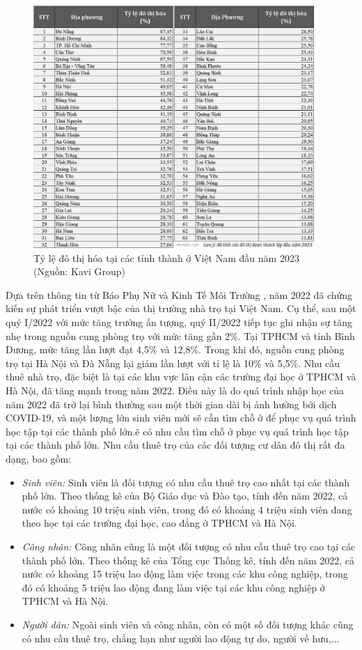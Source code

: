 \begin{figure}[H]
    \centering
    \includegraphics[width=0.95\textwidth]{Images/Overview/TyLeDoThiHoa.jpg}
    \caption{Tỷ lệ đô thị hóa tại các tỉnh thành ở Việt Nam đầu năm 2023 (Nguồn: Kavi Group)}
\end{figure}
\hspace*{1cm} Dựa trên thông tin từ Báo Phụ Nữ \cite{phunu} và Kinh Tế Môi Trường \cite{ktmt}, năm 2022 đã chứng kiến sự phát triển vượt bậc của thị trường nhà trọ tại Việt Nam. Cụ thể, sau một quý I/2022 với mức tăng trưởng ấn tượng, quý II/2022 tiếp tục ghi nhận sự tăng nhẹ trong nguồn cung phòng trọ với mức tăng gần 2\%. Tại TPHCM và tỉnh Bình Dương, mức tăng lần lượt đạt 4,5\% và 12,8\%. Trong khi đó, nguồn cung phòng trọ tại Hà Nội và Đà Nẵng lại giảm lần lượt với tỉ lệ là 10\% và 5,5\%. Nhu cầu thuê nhà trọ, đặc biệt là tại các khu vực lân cận các trường đại học ở TPHCM và Hà Nội, đã tăng mạnh trong năm 2022. Điều này là do quá trình nhập học của năm 2022 đã trở lại bình thường sau một thời gian dài bị ảnh hưởng bởi dịch COVID-19, và một lượng lớn sinh viên mới sẽ cần tìm chỗ ở để phục vụ quá trình học tập tại các thành phố lớn.ẽ có nhu cầu tìm chỗ ở phục vụ quá trình học tập tại các thành phố lớn.
Nhu cầu thuê trọ của các đối tượng cư dân đô thị rất đa dạng, bao gồm:
\begin{itemize}
    \item \textit{Sinh viên:} Sinh viên là đối tượng có nhu cầu thuê trọ cao nhất tại các thành phố lớn. Theo thống kê của Bộ Giáo dục và Đào tạo, tính đến năm 2022, cả nước có khoảng 10 triệu sinh viên, trong đó có khoảng 4 triệu sinh viên đang theo học tại các trường đại học, cao đẳng ở TPHCM và Hà Nội.
    \item \textit{Công nhân:} Công nhân cũng là một đối tượng có nhu cầu thuê trọ cao tại các thành phố lớn. Theo thống kê của Tổng cục Thống kê, tính đến năm 2022, cả nước có khoảng 15 triệu lao động làm việc trong các khu công nghiệp, trong đó có khoảng 5 triệu lao động đang làm việc tại các khu công nghiệp ở TPHCM và Hà Nội.
    \item \textit{Người dân:} Ngoài sinh viên và công nhân, còn có một số đối tượng khác cũng có nhu cầu thuê trọ, chẳng hạn như người lao động tự do, người về hưu,...
\end{itemize}
